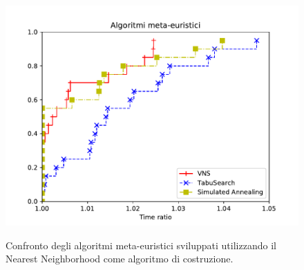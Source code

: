 \begin{figure}[h] 
\begin{center} 
  \includegraphics[scale=0.8]{Images/pp_heuristic}\\ 
  \caption{\footnotesize{Confronto degli algoritmi meta-euristici sviluppati utilizzando il Nearest Neighborhood come algoritmo di costruzione.}}
  \label{perf_profile} 
\end{center} 
\end{figure}